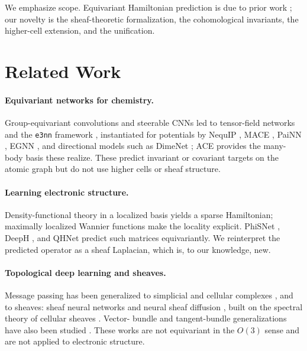 \documentclass[pdflatex,sn-mathphys-num]{sn-jnl}%
\theoremstyle{thmstyleone}
\theoremstyle{thmstyletwo}
\theoremstyle{thmstylethree}
\begin{document}
We emphasize scope. Equivariant Hamiltonian prediction is due to prior work
\cite{phisnet,deeph,qhnet}; our novelty is the sheaf-theoretic formalization,
the cohomological invariants, the higher-cell extension, and the unification.

\section{Related Work}\label{sec:related}

\paragraph{Equivariant networks for chemistry.}
Group-equivariant convolutions \cite{cohenwelling2016} and steerable CNNs
\cite{weiler2018} led to tensor-field networks \cite{tfn} and the \texttt{e3nn}
framework \cite{e3nn}, instantiated for potentials by NequIP \cite{nequip},
MACE \cite{mace}, PaiNN \cite{painn}, EGNN \cite{egnn}, and directional models
such as DimeNet \cite{dimenet}; ACE \cite{drautz2019} provides the many-body
basis these realize. These predict invariant or covariant targets on the atomic
graph but do not use higher cells or sheaf structure.

\paragraph{Learning electronic structure.}
Density-functional theory \cite{hohenbergkohn1964,kohnsham1965} in a localized
basis yields a sparse Hamiltonian; maximally localized Wannier functions
\cite{marzari2012} make the locality explicit. PhiSNet \cite{phisnet}, DeepH
\cite{deeph}, and QHNet \cite{qhnet} predict such matrices equivariantly. We
reinterpret the predicted operator as a sheaf Laplacian, which is, to our
knowledge, new.

\paragraph{Topological deep learning and sheaves.}
Message passing has been generalized to simplicial \cite{mpsn,barbarossa2020,
schaub2020} and cellular complexes \cite{cwn}, and to sheaves: sheaf neural
networks \cite{hansengebhart2020} and neural sheaf diffusion \cite{bodnar2022},
built on the spectral theory of cellular sheaves \cite{hansenghrist2019}. Vector-
bundle and tangent-bundle generalizations have also been studied
\cite{battiloro2024}.
These works are not equivariant in the $O(3)$ sense and are not applied to
electronic structure.
\end{document}
